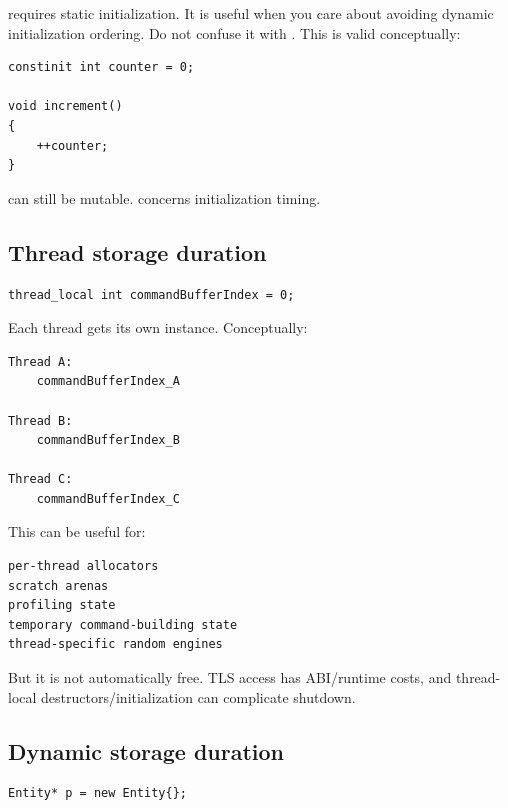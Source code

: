  requires static initialization. It is useful when you care about avoiding dynamic initialization ordering. Do not confuse it with . This is valid conceptually:

\begin{verbatim}
constinit int counter = 0;

void increment()
{
    ++counter;
}
\end{verbatim}

 can still be mutable.  concerns initialization timing.

\subsection{Thread storage duration}\label{05-engine-i-ch002-thread-storage-duration}

\hypertarget{05-engine-i-ch002-thread-storage-duration}{}

\begin{verbatim}
thread_local int commandBufferIndex = 0;
\end{verbatim}

Each thread gets its own instance. Conceptually:

\begin{verbatim}
Thread A:
    commandBufferIndex_A

Thread B:
    commandBufferIndex_B

Thread C:
    commandBufferIndex_C
\end{verbatim}

This can be useful for:

\begin{verbatim}
per-thread allocators
scratch arenas
profiling state
temporary command-building state
thread-specific random engines
\end{verbatim}

But it is not automatically free. TLS access has ABI/runtime costs, and thread-local destructors/initialization can complicate shutdown.

\subsection{Dynamic storage duration}\label{05-engine-i-ch002-dynamic-storage-duration}

\hypertarget{05-engine-i-ch002-dynamic-storage-duration}{}

\begin{verbatim}
Entity* p = new Entity{};
\end{verbatim}

